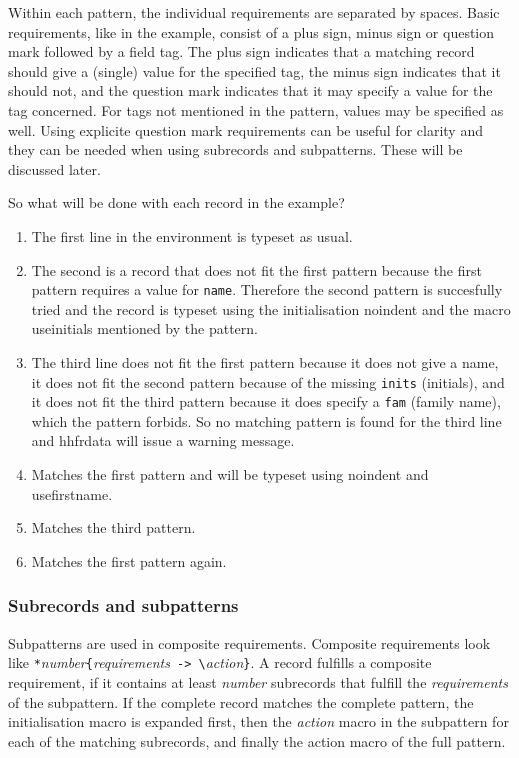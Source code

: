 \documentclass[11pt]{article}
\makeatletter
\def\packagename#1{{\sffamily #1}}     %
\def\macroname#1{{\ttfamily\@ttbs#1}}  %
\def\hhfrdata{\packagename{hhfrdata}\xspace}
\def\={\verb=}
\def\<#1>{\macroname{#1}}
\makeatother
\begin{document}
Within each pattern, the individual requirements are separated by spaces.
Basic requirements, like in the example, consist of a plus sign,
minus sign or question mark followed by a field tag. The plus sign
indicates that a matching record
should give a (single) value for the specified tag, the minus sign indicates
that it should not, and the question mark indicates that it may specify
a value for the tag concerned. For tags not mentioned in the pattern, values
may be specified as well. Using explicite question mark requirements
can be useful for clarity and they can be needed when using subrecords and
subpatterns. These will be discussed later.

So what will be done with each record in the example?
\begin{enumerate}
\item The first line in the environment is typeset as usual.
\item The second is a record that does not fit the first pattern because the
  first pattern requires a value for \texttt{name}. Therefore the second pattern is
  succesfully tried and the record is typeset using the initialisation
  \<noindent> and the macro \<useinitials> mentioned by the pattern.
\item The third line does not fit the first pattern because it does not
  give a name, it does not fit the second pattern because of the missing
  \texttt{inits} (initials), and it does not fit the third pattern because
  it does specify a \texttt{fam} (family name), which the pattern forbids.
  So no matching pattern is found for the third line and \hhfrdata will issue
  a warning message.
\item Matches the first pattern and will be typeset using \<noindent>
  and \<usefirstname>.
\item Matches the third pattern.
\item Matches the first pattern again.
\end{enumerate}
\subsubsection{Subrecords and subpatterns}

Subpatterns are used in composite requirements. Composite requirements
look like
\=*=\textit{number}\={=\textit{requirements}\= -> \=\textit{action}\=}=.
A record fulfills a composite requirement, if it contains at least
\textit{number} subrecords that fulfill the \textit{requirements} of
the subpattern. If the complete record matches the complete pattern,
the initialisation macro is expanded first, then the \textit{action}
macro in the subpattern for each of the matching subrecords, and
finally the action macro of the full pattern.
\end{document}

